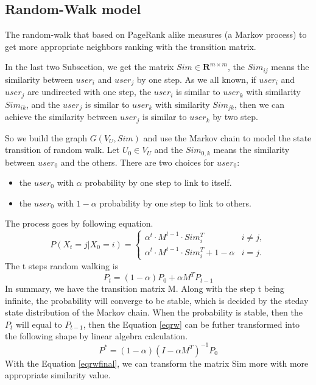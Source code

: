 \documentclass[conference]{IEEEtran}
\begin{document}
\subsection{Random-Walk model}
\par The random-walk that based on PageRank alike measures (a Markov process) to get more appropriate neighbors ranking with the transition matrix.
\par In the last two Subsection, we get the matrix $Sim \in \textbf{R}^{m \times m}$, the $Sim_{ij}$ means the similarity between $user_{i}$ and $user_{j}$ by one step. As we all known, if $user_{i}$ and $user_{j}$ are undirected with one step,
the $user_{i}$ is similar to $user_{k}$ with similarity $Sim_{ik}$, and the $user_{j}$ is similar to $user_{k}$ with similarity $Sim_{jk}$, then we can achieve the similarity between  $user_{j}$ is similar to $user_{k}$ by two step. 
\par So we build the graph $G(V_{U},Sim)$ and use the Markov chain to model the state transition of random walk. Let $U_{0} \in V_{U}$ and the $Sim_{0,k}$ means the similarity between $user_{0}$ and the others. There are two choices for $user_{0}$:
\begin{itemize}
\item the $user_{0}$ with $\alpha$ probability by one step to link to itself.
\item the $user_{0}$ with $1- \alpha$ probability by one step to link to others.
\end{itemize}

The process goes by following equation.
\begin{equation}
P(X_{t}=j|X_{0}=i)=\left\{\begin{array}{ll}
\alpha ^{t} \cdot M^{t-1} \cdot Sim_{i}^{T}&i \neq j,\\
\alpha ^{t} \cdot M^{t-1} \cdot Sim_{i}^{T} + 1-\alpha &i = j.
\end{array}\right.
\end{equation}
The t steps random walking is 
\begin{equation}
P_{t}=(1-\alpha)P_{0}+ \alpha M^{T}P_{t-1} 
\label{eqrw}
\end{equation}
In summary, we have the transition matrix M. Along with the step t being infinite, the probability will converge to be stable, which is decided by the steday state distribution of the Markov chain. When the probability is stable, then the $P_{t}$ will equal to $P_{t-1}$, then the Equation \ref{eqrw} can be futher transformed into the following shape by linear algebra calculation.
\begin{equation}
P^{*}=(1-\alpha)(I-\alpha M^{T})^{-1}P_{0}
\label{eqrwfinal}
\end{equation} 
With the Equation \ref{eqrwfinal}, we can transform the matrix Sim more with more appropriate similarity value.
\end{document}

